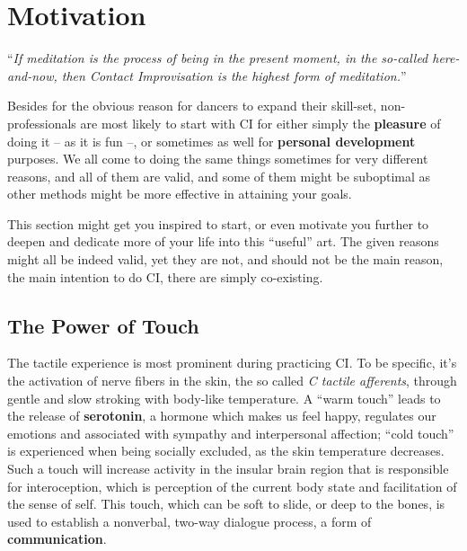 \chapter{Motivation}\label{ch:motivation}


\begin{displayquote}
    ``\textit{If meditation is the process of being in the present moment, in the so-called here-and-now, then Contact Improvisation is the highest form of meditation.}''
\end{displayquote}

Besides for the obvious reason for dancers to expand their skill-set, non-professionals are most likely to start with CI for either simply the \textbf{pleasure} of doing it -- as it is fun --, or sometimes as well for \textbf{personal development} purposes.
We all come to doing the same things sometimes for very different reasons, and all of them are valid, and some of them might be suboptimal as other methods might be more effective in attaining your goals.

This section might get you inspired to start, or even motivate you further to deepen and dedicate more of your life into this ``useful'' art.
The given reasons might all be indeed valid, yet they are not, and should not be the main reason, the main intention to do CI, there are simply co-existing.

\section{The Power of Touch}\label{sec:the-power-of-touch}

The tactile experience is most prominent during practicing CI. To be specific, it's the activation of nerve fibers in the skin, the so called \textit{C tactile afferents}, through gentle and slow stroking with body-like temperature.
A ``warm touch'' leads to the release of \textbf{serotonin}, a hormone which makes us feel happy, regulates our emotions and associated with sympathy and interpersonal affection; ``cold touch'' is experienced when being socially excluded, as the skin temperature decreases.
Such a touch will increase activity in the insular brain region that is responsible for interoception, which is perception of the current body state and facilitation of the sense of self.
This touch, which can be soft to slide, or deep to the bones, is used to establish a nonverbal, two-way dialogue process, a form of \textbf{communication}.

